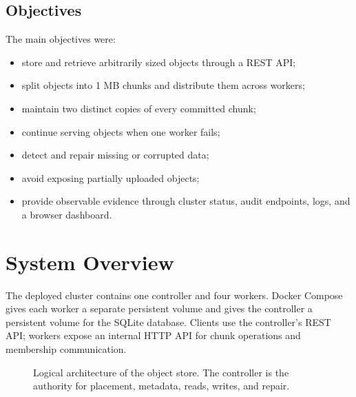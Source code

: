 \documentclass[11pt,a4paper]{article}
\begin{document}
\subsection{Objectives}
The main objectives were:
\begin{itemize}
  \item store and retrieve arbitrarily sized objects through a REST API;
  \item split objects into 1 MB chunks and distribute them across workers;
  \item maintain two distinct copies of every committed chunk;
  \item continue serving objects when one worker fails;
  \item detect and repair missing or corrupted data;
  \item avoid exposing partially uploaded objects;
  \item provide observable evidence through cluster status, audit endpoints, logs, and a browser dashboard.
\end{itemize}

\section{System Overview}

The deployed cluster contains one controller and four workers. Docker Compose gives each worker a separate persistent volume and gives the controller a persistent volume for the SQLite database. Clients use the controller's REST API; workers expose an internal HTTP API for chunk operations and membership communication.

\begin{figure}[H]
\centering
{}
\caption{Logical architecture of the object store. The controller is the authority for placement, metadata, reads, writes, and repair.}
\end{figure}
\end{document}
